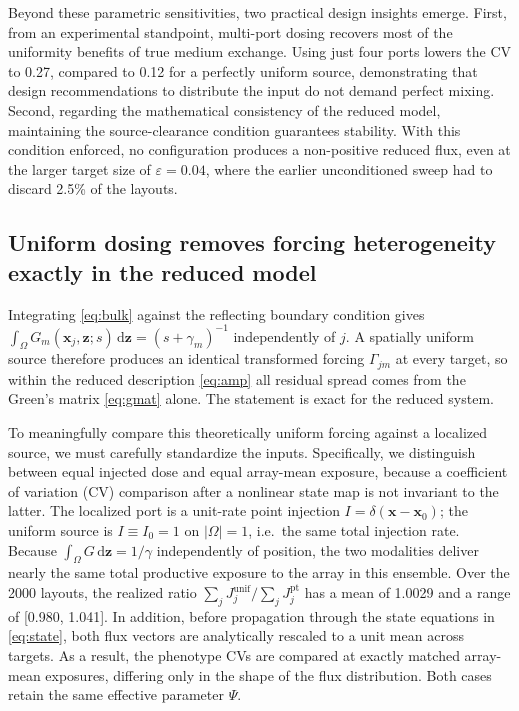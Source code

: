 \documentclass[pdflatex,sn-mathphys-num]{sn-jnl}
\numberwithin{equation}{section}
\theoremstyle{thmstyleone}%
\theoremstyle{definition}
\theoremstyle{remark}
\newcommand{\dd}{\,\mathrm{d}}
\begin{document}
Beyond these parametric sensitivities, two practical design insights emerge. First, from an experimental standpoint, multi-port dosing recovers most of the uniformity benefits of true medium exchange. Using just four ports lowers the CV to 0.27, compared to 0.12 for a perfectly uniform source, demonstrating that design recommendations to distribute the input do not demand perfect mixing. Second, regarding the mathematical consistency of the reduced model, maintaining the source-clearance condition guarantees stability. With this condition enforced, no configuration produces a non-positive reduced flux, even at the larger target size of $\varepsilon=0.04$, where the earlier unconditioned sweep had to discard 2.5\% of the layouts.

\subsection{Uniform dosing removes forcing heterogeneity exactly in the reduced model}
\label{subsec:dosing_design}

Integrating \eqref{eq:bulk} against the reflecting boundary condition gives
$\int_\Omega G_m(\mathbf x_j,\mathbf z;s)\dd\mathbf z=(s+\gamma_m)^{-1}$
independently of $j$. A spatially uniform source therefore produces an
identical transformed forcing $\Gamma_{jm}$ at every target, so within
the reduced description \eqref{eq:amp} all residual spread comes from the
Green's matrix \eqref{eq:gmat} alone. The statement is exact for the reduced
system.

To meaningfully compare this theoretically uniform forcing against a localized source, we must carefully standardize the inputs. Specifically, we distinguish between equal injected dose and equal array-mean exposure, because a coefficient of variation (CV) comparison after a nonlinear state map is not invariant to the latter.
The localized port is a unit-rate point
injection $I=\delta(\mathbf x-\mathbf x_0)$; the uniform source is
$I\equiv I_0=1$ on $|\Omega|=1$, i.e.\ the same total injection rate.
Because $\int_\Omega G\dd\mathbf z=1/\gamma$ independently of position, the two modalities deliver nearly the same total productive exposure to the array in this ensemble. Over the 2000 layouts, the realized ratio $\sum_jJ^{\mathrm{unif}}_j/\sum_jJ^{\mathrm{pt}}_j$ has a mean of 1.0029 and a range of [0.980, 1.041]. In addition, before propagation through the state equations in \eqref{eq:state}, both flux vectors are analytically rescaled to a unit mean across targets. As a result, the phenotype CVs are compared at exactly matched array-mean exposures, differing only in the shape of the flux distribution. Both cases retain the same effective parameter $\Psi$.
\end{document}
